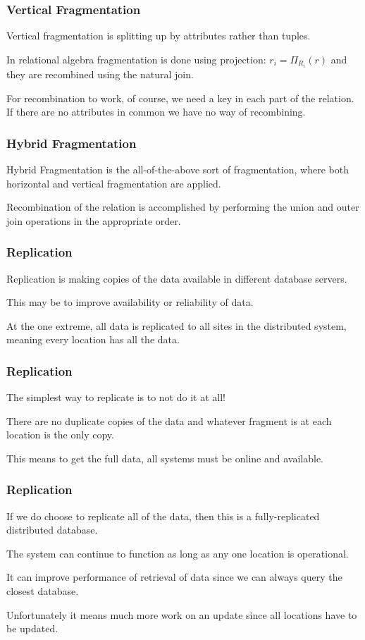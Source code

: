 \begin{frame}
\frametitle{Vertical Fragmentation}

\alert{Vertical fragmentation} is splitting up by attributes rather than tuples. 

In relational algebra fragmentation is done using projection: $r_{i} = \Pi_{R_{i}}
(r)$ and they are recombined using the natural join. 

For recombination to work, of course, we need a key in each part of the relation. If there are no attributes in common we have no way of recombining. 

\end{frame}



\begin{frame}
\frametitle{Hybrid Fragmentation}

\alert{Hybrid Fragmentation} is the all-of-the-above sort of fragmentation, where both horizontal and vertical fragmentation are applied. 

Recombination of the relation is accomplished by performing the union and outer join operations in the appropriate order.


\end{frame}

\begin{frame}
\frametitle{Replication}


Replication is making copies of the data available in different database servers. 

This may be to improve availability or reliability of data. 

At the one extreme, all data is replicated to all sites in the distributed system, meaning every location has all the data.

\end{frame}

\begin{frame}
\frametitle{Replication}

The simplest way to replicate is to not do it at all! 

There are no duplicate copies of the data and whatever fragment is at each location is the only copy. 

This means to get the full data, all systems must be online and available. 

\end{frame}


\begin{frame}
\frametitle{Replication}

If we do choose to replicate all of the data, then this is a fully-replicated distributed database.

The system can continue to function as long as any one location is operational.

It can improve performance of retrieval of data since we can always query the closest database. 

Unfortunately it means much more work on an update since all locations have to be updated.

\end{frame}

